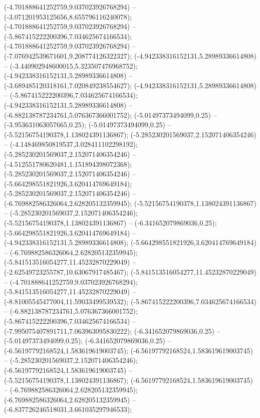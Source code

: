  (-4.701888641252759,9.037023926768294) -- (-3.071201953125656,8.655796116240078);
 (-4.701888641252759,9.037023926768294) -- (-5.867415222200396,7.034625674166534);
 (-4.701888641252759,9.037023926768294) -- (-7.076942539671601,9.208774126322327);
 (-4.942338316152131,5.28989336614808) -- (-3.440902948600015,5.323507476968752);
 (-4.942338316152131,5.28989336614808) -- (-3.689485120318161,7.020849238554627);
 (-4.942338316152131,5.28989336614808) -- (-5.867415222200396,7.034625674166534);
 (-4.942338316152131,5.28989336614808) -- (-6.882138787234761,5.076367366001752);
 (-5.01497373494099,0.25) -- (-3.953631063057665,0.25);
 (-5.01497373494099,0.25) -- (-5.52156754190378,1.138024391136867);
 (-5.285230201569037,2.152071406354246) -- (-4.148469850819537,3.028411102298192);
 (-5.285230201569037,2.152071406354246) -- (-4.512551780620481,1.151894398072368);
 (-5.285230201569037,2.152071406354246) -- (-5.664298551821926,3.620414769649184);
 (-5.285230201569037,2.152071406354246) -- (-6.769882586326064,2.628205132359945);
 (-5.52156754190378,1.138024391136867) -- (-5.285230201569037,2.152071406354246);
 (-5.52156754190378,1.138024391136867) -- (-6.341652079869036,0.25);
 (-5.664298551821926,3.620414769649184) -- (-4.942338316152131,5.28989336614808);
 (-5.664298551821926,3.620414769649184) -- (-6.769882586326064,2.628205132359945);
 (-5.841513516054277,11.45232870229049) -- (-2.62549723255787,10.63067917485467);
 (-5.841513516054277,11.45232870229049) -- (-4.701888641252759,9.037023926768294);
 (-5.841513516054277,11.45232870229049) -- (-8.81005545477004,11.59033499539532);
 (-5.867415222200396,7.034625674166534) -- (-6.882138787234761,5.076367366001752);
 (-5.867415222200396,7.034625674166534) -- (-7.995075407891711,7.063963095830222);
 (-6.341652079869036,0.25) -- (-5.01497373494099,0.25);
 (-6.341652079869036,0.25) -- (-6.56197792168524,1.583619619003745);
 (-6.56197792168524,1.583619619003745) -- (-5.285230201569037,2.152071406354246);
 (-6.56197792168524,1.583619619003745) -- (-5.52156754190378,1.138024391136867);
 (-6.56197792168524,1.583619619003745) -- (-6.769882586326064,2.628205132359945);
 (-6.769882586326064,2.628205132359945) -- (-6.837726246518031,3.661035297946533);
